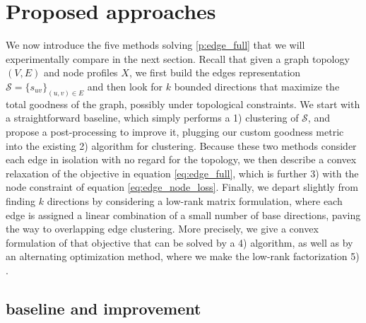 

\section{Proposed approaches}
\label{sec:edge_methods}

We now introduce the five methods solving \autoref{p:edge_full} that we will experimentally compare
in the next section. Recall that given a graph topology $(V, E)$ and node profiles $X$, we first
build the edges representation $\mathcal{S} = \{s_{uv}\}_{(u,v) \in E}$ and then look for $k$
bounded directions that maximize the total goodness of the graph, possibly under topological
constraints. We start with a straightforward baseline, which simply performs a \newline
\hspace*{14pt} 1) \kmeans{} clustering of $\mathcal{S}$, \newline
and propose a post-processing to improve it, plugging our custom goodness metric into the existing
\newline \hspace*{14pt} 2) \lloyd{} algorithm for clustering. \newline
Because these two methods consider each edge in isolation with no regard for the topology, we then
describe a convex relaxation of the objective in equation \eqref{eq:edge_full}, which is further
\newline \hspace*{14pt} 3) \combined{} with the node constraint of equation
\eqref{eq:edge_node_loss}. \newline
Finally, we depart slightly from finding $k$ directions by
considering a low-rank matrix formulation, where each edge is assigned a linear combination of a
small number of base directions, paving the way to overlapping edge clustering. More precisely, we
give a convex formulation of that objective that can be solved by a \newline
\hspace*{14pt} 4) \fwa{} algorithm, \newline
as well as by an alternating optimization method, where we make the low-rank factorization \newline
\hspace*{14pt} 5) \pqt{}.

\subsection{\kmeans{} baseline and improvement}
\label{sub:edge_baseline}

